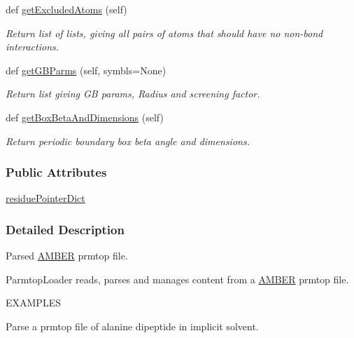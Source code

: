 \begin{DoxyCompactItemize}
def \hyperlink{classsrc_1_1amberio_1_1PrmtopLoader_a386295fa291f134fe5d5358a139097b2}{get\+Excluded\+Atoms} (self)
\begin{DoxyCompactList}\small\item\em Return list of lists, giving all pairs of atoms that should have no non-\/bond interactions. \end{DoxyCompactList}\item 
def \hyperlink{classsrc_1_1amberio_1_1PrmtopLoader_a66a7271794489b104927997a25a5d6f8}{get\+G\+B\+Parms} (self, symbls=None)
\begin{DoxyCompactList}\small\item\em Return list giving GB params, Radius and screening factor. \end{DoxyCompactList}\item 
def \hyperlink{classsrc_1_1amberio_1_1PrmtopLoader_ae2075caa02525b6e4b2cded2ed7e7a3d}{get\+Box\+Beta\+And\+Dimensions} (self)
\begin{DoxyCompactList}\small\item\em Return periodic boundary box beta angle and dimensions. \end{DoxyCompactList}\end{DoxyCompactItemize}
\subsubsection*{Public Attributes}
\begin{DoxyCompactItemize}
\item 
\hyperlink{classsrc_1_1amberio_1_1PrmtopLoader_a3bfd794a547cf87923949354cd07c844}{residue\+Pointer\+Dict}
\end{DoxyCompactItemize}


\subsubsection{Detailed Description}
Parsed \hyperlink{classsrc_1_1amberio_1_1AMBER}{A\+M\+B\+ER} prmtop file. 

Parmtop\+Loader reads, parses and manages content from a \hyperlink{classsrc_1_1amberio_1_1AMBER}{A\+M\+B\+ER} prmtop file.

E\+X\+A\+M\+P\+L\+ES

Parse a prmtop file of alanine dipeptide in implicit solvent.

